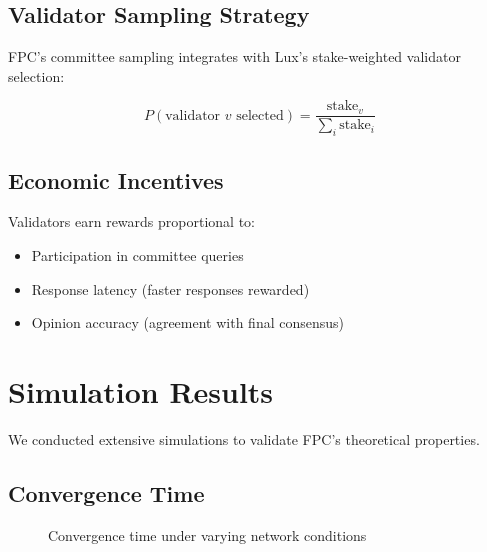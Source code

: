 \documentclass[11pt,a4paper]{article}
\begin{document}
\subsection{Validator Sampling Strategy}

FPC's committee sampling integrates with Lux's stake-weighted validator selection:

\begin{equation}
P(\text{validator } v \text{ selected}) = \frac{\text{stake}_v}{\sum_{i} \text{stake}_i}
\end{equation}

\subsection{Economic Incentives}

Validators earn rewards proportional to:
\begin{itemize}
\item Participation in committee queries
\item Response latency (faster responses rewarded)
\item Opinion accuracy (agreement with final consensus)
\end{itemize}

\section{Simulation Results}
\label{sec:simulation}

We conducted extensive simulations to validate FPC's theoretical properties.

\subsection{Convergence Time}

\begin{figure}[h]
\centering
{}
\caption{Convergence time under varying network conditions}
\label{fig:convergence}
\end{figure}
\end{document}
